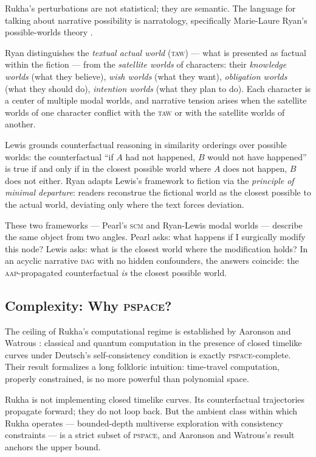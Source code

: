 \documentclass[11pt]{article}
\theoremstyle{rukha}
\begin{document}
Rukha's perturbations are not statistical; they are semantic. The
language for talking about narrative possibility is
narratology, specifically Marie-Laure Ryan's possible-worlds theory
\cite{ryan}.

Ryan distinguishes the \emph{textual actual world} (\textsc{taw}) ---
what is presented as factual within the fiction --- from the
\emph{satellite worlds} of characters: their \emph{knowledge worlds}
(what they believe), \emph{wish worlds} (what they want), \emph{obligation
worlds} (what they should do), \emph{intention worlds} (what they plan
to do). Each character is a center of multiple modal worlds, and
narrative tension arises when the satellite worlds of one character
conflict with the \textsc{taw} or with the satellite worlds of another.

Lewis \cite{lewiscounterfactuals} grounds counterfactual reasoning in
similarity orderings over possible worlds: the counterfactual ``if $A$
had not happened, $B$ would not have happened'' is true if and only if
in the closest possible world where $A$ does not happen, $B$ does not
either. Ryan adapts Lewis's framework to fiction via the
\emph{principle of minimal departure}: readers reconstrue the fictional
world as the closest possible to the actual world, deviating only where
the text forces deviation.

These two frameworks --- Pearl's \textsc{scm} and Ryan-Lewis modal
worlds --- describe the same object from two angles. Pearl asks: what
happens if I surgically modify this node? Lewis asks: what is the closest
world where the modification holds? In an acyclic narrative \textsc{dag}
with no hidden confounders, the answers coincide: the
\textsc{aap}-propagated counterfactual \emph{is} the closest possible
world.

\subsection{Complexity: Why \textsc{pspace}?}

The ceiling of Rukha's computational regime is established by
Aaronson and Watrous \cite{aaronsonwatrous}: classical and quantum
computation in the presence of closed timelike curves under Deutsch's
self-consistency condition is exactly \textsc{pspace}-complete. Their
result formalizes a long folkloric intuition: time-travel computation,
properly constrained, is no more powerful than polynomial space.

Rukha is not implementing closed timelike curves. Its counterfactual
trajectories propagate forward; they do not loop back. But the ambient
class within which Rukha operates --- bounded-depth multiverse exploration
with consistency constraints --- is a strict subset of
\textsc{pspace}, and Aaronson and Watrous's result anchors the
upper bound.
\end{document}
